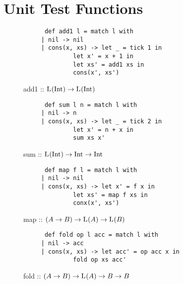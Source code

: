 \chapter{Unit Test Functions}

\begin{figure}[H]
   \begin{verbatim}
      def add1 l = match l with 
	 | nil -> nil
	 | cons(x, xs) -> let _ = tick 1 in 
			  let x' = x + 1 in
			  let xs' = add1 xs in
			  cons(x', xs')
   \end{verbatim}
   \caption{add1 :: \(\text{L}^{}(\text{Int}) \to \text{L}^{}(\text{Int})\)}
\label{fig:code-add1}
\end{figure}

\begin{figure}[H]
   \begin{verbatim}
      def sum l n = match l with 
	 | nil -> n
	 | cons(x, xs) -> let _ = tick 2 in 
			  let x' = n + x in
			  sum xs x'
   \end{verbatim}
   \caption{sum :: \(\text{L}^{}(\text{Int}) \to \text{Int} \to \text{Int}\)}
\label{fig:code-sum}
\end{figure}

\begin{figure}[H]
   \begin{verbatim}
      def map f l = match l with
	 | nil -> nil
	 | cons(x, xs) -> let x' = f x in
			  let xs' = map f xs in
			  conx(x', xs')
   \end{verbatim}
   \caption{map :: \((A \to B) \to \text{L}^{}(A) \to \text{L}^{}(B)\)}
\label{fig:code-map}
\end{figure}

\begin{figure}[H]
   \begin{verbatim}
      def fold op l acc = match l with
	 | nil -> acc
	 | cons(x, xs) -> let acc' = op acc x in 
			  fold op xs acc'
      \end{verbatim}
   \caption{fold :: \((A \to B) \to \text{L}^{}(A) \to B \to B\)}
\label{fig:code-fold}
\end{figure}

